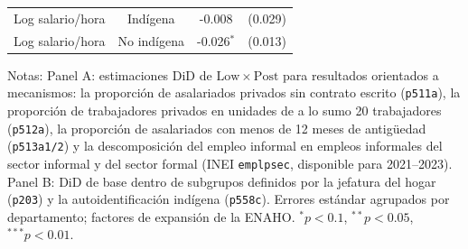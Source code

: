 \begin{table}[!tbp]
\begin{threeparttable}
\begin{tabular}{lccc}
Log salario/hora & Indígena & -0.008 & (0.029) \\
Log salario/hora & No indígena & -0.026$^{*}$ & (0.013) \\
\bottomrule
\end{tabular}
\begin{tablenotes}\footnotesize
\item Notas: Panel A: estimaciones DiD de $\mathrm{Low}\times\mathrm{Post}$ para resultados orientados a mecanismos: la proporción de asalariados privados sin contrato escrito (\texttt{p511a}), la proporción de trabajadores privados en unidades de a lo sumo 20 trabajadores (\texttt{p512a}), la proporción de asalariados con menos de 12 meses de antigüedad (\texttt{p513a1/2}) y la descomposición del empleo informal en empleos informales del sector informal y del sector formal (INEI \texttt{emplpsec}, disponible para 2021--2023). Panel B: DiD de base dentro de subgrupos definidos por la jefatura del hogar (\texttt{p203}) y la autoidentificación indígena (\texttt{p558c}). Errores estándar agrupados por departamento; factores de expansión de la ENAHO. $^{*}p<0.1$, $^{**}p<0.05$, $^{***}p<0.01$.
\end{tablenotes}
\end{threeparttable}\end{table}
